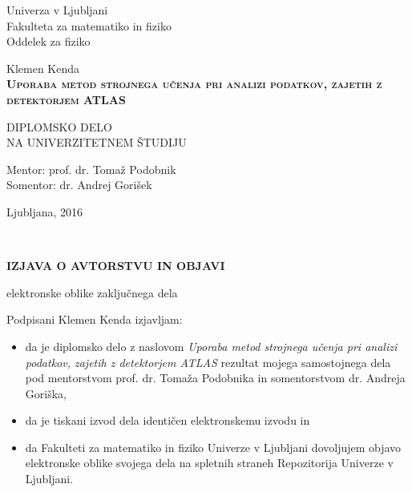 \thispagestyle{empty} 

\begin{center}
{\large 
Univerza v Ljubljani\\
Fakulteta za matematiko in fiziko\\
Oddelek za fiziko
}

\vspace{3cm}
{\LARGE Klemen Kenda}\\

\vspace{2cm}
\textsc{\textbf{
\LARGE 
Uporaba metod strojnega učenja pri analizi podatkov, zajetih z detektorjem ATLAS }}

\vspace{2cm}
{ DIPLOMSKO DELO}\\
{ NA UNIVERZITETNEM ŠTUDIJU\\}

\vspace{2cm} 
{\Large Mentor: prof. dr. Tomaž Podobnik} \\
{\Large Somentor: dr. Andrej Gorišek}

\vfill
{\Large Ljubljana, 2016}
\end{center}

\newpage

\ \thispagestyle{empty}
\newpage

\thispagestyle{empty}

\vspace{1cm}
\begin{center} 
{\Large \textbf{IZJAVA O AVTORSTVU IN OBJAVI}}
\end{center}

\begin{center} 
{\Large elektronske oblike zaključnega dela}
\end{center}

\vspace{1cm}
Podpisani Klemen Kenda izjavljam:

\begin{itemize}
	\item da je diplomsko delo z naslovom \textit{Uporaba metod strojnega učenja pri analizi podatkov, zajetih z detektorjem ATLAS} rezultat mojega samostojnega dela pod mentorstvom prof. dr. Tomaža Podobnika in somentorstvom dr. Andreja Goriška,
	\item da je tiskani izvod dela identičen elektronskemu izvodu in 
	\item da Fakulteti za matematiko in fiziko Univerze v Ljubljani dovoljujem objavo elektronske oblike svojega dela na spletnih straneh Repozitorija Univerze v Ljubljani.
\end{itemize}

